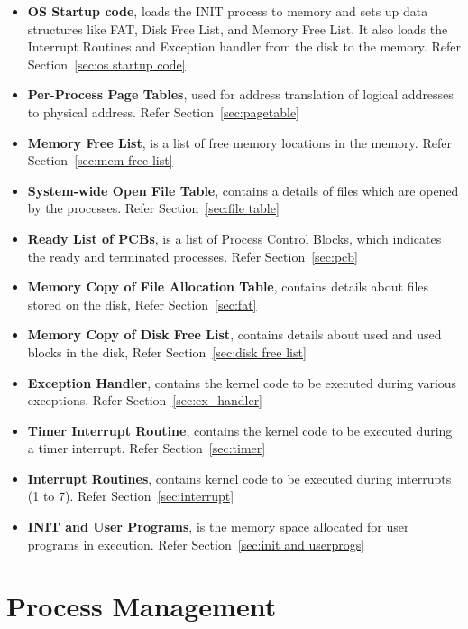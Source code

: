 \documentclass[10pt]{report}
\begin{document}
\begin{itemize}
	
	\item \textbf{OS Startup code}, loads the INIT process to memory and sets up data structures like FAT, Disk Free List, and Memory Free List. It also loads the Interrupt Routines and Exception handler from the disk to the memory. Refer Section~\ref{sec:os startup code}
	\item \textbf{Per-Process Page Tables}, used for address translation of logical addresses to physical address. Refer Section~\ref{sec:pagetable}
	\item \textbf{Memory Free List}, is a list of free memory locations in the memory. Refer Section~\ref{sec:mem free list}
	\item \textbf{System-wide Open File Table}, contains a details of files which are opened by the processes. Refer Section~\ref{sec:file table}
	\item \textbf{Ready List of PCBs}, is a list of Process Control Blocks, which indicates the ready and terminated processes. Refer Section~\ref{sec:pcb}
	\item \textbf{Memory Copy of File Allocation Table}, contains details about files stored on the disk, Refer Section~\ref{sec:fat}
	\item \textbf{Memory Copy of Disk Free List}, contains details about used and used blocks in the disk, Refer Section~\ref{sec:disk free list}
	\item \textbf{Exception Handler}, contains the kernel code to be executed during various exceptions, Refer Section~\ref{sec:ex_handler}
	\item \textbf{Timer Interrupt Routine}, contains the kernel code to be executed during a timer interrupt. Refer Section~\ref{sec:timer}
	
	\item \textbf{Interrupt Routines}, contains kernel code to be executed during interrupts (1 to 7). Refer Section~\ref{sec:interrupt}
	\item \textbf{INIT and User Programs}, is the memory space allocated for user programs in execution. Refer Section~\ref{sec:init and userprogs}
\end{itemize}




\chapter{Process Management}
\label{chp:process}
\end{document}
